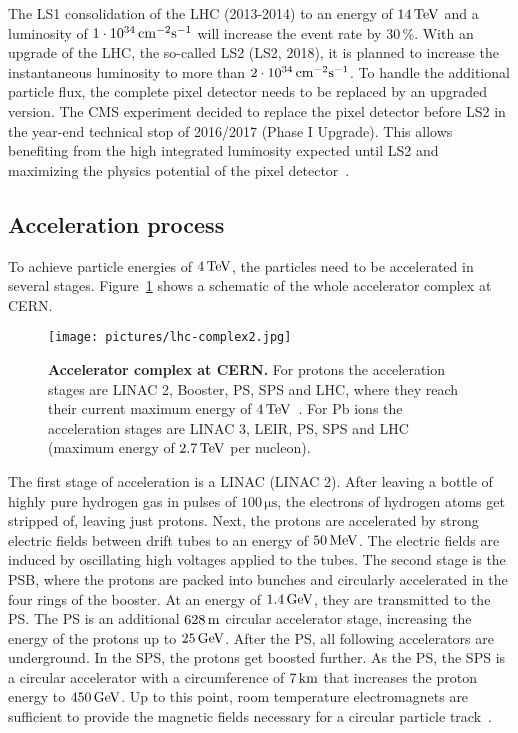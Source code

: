 The \ac{LS1} consolidation of the \ac{LHC} (2013-2014) to an energy of $14\,\rm{TeV}$ and a luminosity of $1\cdot 10^{34}\,\rm{cm^{-2}s^{-1}}$ will increase the event rate by $30\,\%$. With an upgrade of the \ac{LHC}, the so-called \acl{LS2} (\acs{LS2}, 2018), it is planned to increase the instantaneous luminosity to more than $2\cdot 10^{34}\,\rm{cm^{-2}s^{-1}}$. To handle the additional particle flux, the complete pixel detector needs to be replaced by an upgraded version. The \ac{CMS} experiment decided to replace the pixel detector before \acs{LS2} in the year-end technical stop of 2016/2017 (Phase I Upgrade). This allows benefiting from the high integrated luminosity expected until \acs{LS2} and maximizing the physics potential of the pixel detector~\cite{Dom12}.

\subsection{Acceleration process}
To achieve particle energies of $4\,\rm{TeV}$, the particles need to be accelerated in several stages. Figure~\ref{fig:acceleration_complex} shows a schematic of the whole accelerator complex at CERN.
\begin{figure}
\begin{center}
\texttt{[image: pictures/lhc-complex2.jpg]}
\end{center}
\caption[Accelerator complex at CERN]{\textbf{Accelerator complex at CERN.} For protons the acceleration stages are LINAC 2, Booster, PS, SPS and \acs{LHC}, where they reach their current maximum energy of $4\,\rm{TeV}$~\cite{LHC14b}. For Pb ions the acceleration stages are LINAC 3, LEIR, PS, SPS and \acs{LHC} (maximum energy of $2.7\,\rm{TeV}$ per nucleon).
}\label{fig:acceleration_complex}
\end{figure}

The first stage of acceleration is a \acl{LINAC} (\acs{LINAC} 2). After leaving a bottle of highly pure hydrogen gas in pulses of $100\,\si{\micro \second}$, the electrons of hydrogen atoms get stripped of, leaving just protons. Next, the protons are accelerated by strong electric fields between drift tubes to an energy of $50\,\rm{MeV}$. The electric fields are induced by oscillating high voltages applied to the tubes. The second stage is the \ac{PSB}, where the protons are packed into bunches and circularly accelerated in the four rings of the booster. At an energy of $1.4\,\rm{GeV}$, they are transmitted to the \ac{PS}. The \ac{PS} is an additional $628\,\rm{m}$ circular accelerator stage, increasing the energy of the protons up to $25\,\rm{GeV}$. After the \ac{PS}, all following accelerators are underground. In the \ac{SPS}, the protons get boosted further. As the \ac{PS}, the \ac{SPS} is a circular accelerator with a circumference of $7\,\rm{km}$ that increases the proton energy to $450\,\rm{GeV}$. Up to this point, room temperature electromagnets are sufficient to provide the magnetic fields necessary for a circular particle track~\cite{LHC14}.

